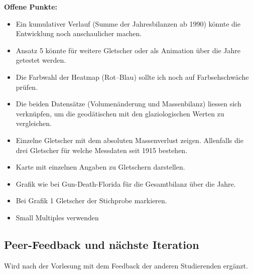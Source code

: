 \documentclass[
  nswissgerman,
  11pt,
  a4paper,
  DIV=11,
  numbers=noendperiod]{scrartcl}
\providecommand{\tightlist}{%
  \setlength{\itemsep}{0pt}\setlength{\parskip}{0pt}}
\begin{document}
\textbf{Offene Punkte:}

\begin{itemize}
\tightlist
\item
  Ein kumulativer Verlauf (Summe der Jahresbilanzen ab 1990) könnte die
  Entwicklung noch anschaulicher machen.
\item
  Ansatz 5 könnte für weitere Gletscher oder als Animation über die
  Jahre getestet werden.
\item
  Die Farbwahl der Heatmap (Rot--Blau) sollte ich noch auf
  Farbsehschwäche prüfen.
\item
  Die beiden Datensätze (Volumenänderung und Massenbilanz) liessen sich
  verknüpfen, um die geodätischen mit den glaziologischen Werten zu
  vergleichen.
\item
  Einzelne Gletscher mit dem absoluten Massenverlust zeigen. Allenfalls
  die drei Gletscher für welche Messdaten seit 1915 bestehen.
\item
  Karte mit einzelnen Angaben zu Gletschern darstellen.
\item
  Grafik wie bei Gun-Death-Florida für die Gesamtbilanz über die Jahre.
\item
  Bei Grafik 1 Gletscher der Stichprobe markieren.
\item
  Small Multiples verwenden
\end{itemize}

\subsection{Peer-Feedback und nächste
Iteration}\label{peer-feedback-und-nuxe4chste-iteration}

\begin{tcolorbox}[enhanced jigsaw, arc=.35mm, bottomrule=.15mm, bottomtitle=1mm, breakable, colback=white, colbacktitle=quarto-callout-note-color!10!white, colframe=quarto-callout-note-color-frame, coltitle=black, left=2mm, leftrule=.75mm, opacityback=0, opacitybacktitle=0.6, rightrule=.15mm, title=\textcolor{quarto-callout-note-color}{\faInfo}\hspace{0.5em}{Hinweis}, titlerule=0mm, toprule=.15mm, toptitle=1mm]

Wird nach der Vorlesung mit dem Feedback der anderen Studierenden
ergänzt.

\end{tcolorbox}
\end{document}
